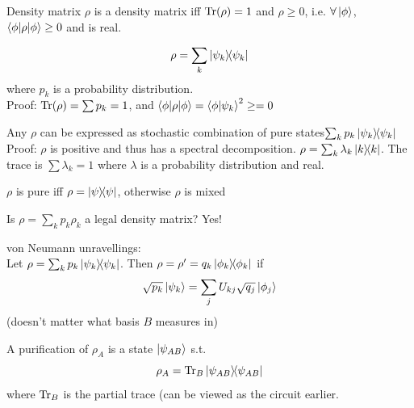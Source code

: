 \begin{definition}
    Density matrix $\rho$ is a density matrix iff $\Tr(\rho) = 1$ and $\rho \geq 0$, i.e. $\forall \ket{\phi}$, $\braket{\phi|\rho|\phi} \geq 0$ and is real. 
\end{definition}

\begin{claim}
    \begin{equation}
        \rho = \sum_k \ketbra{\psi_k}
    \end{equation}
    where $p_k$ is a probability distribution. \\
    Proof: $\Tr(\rho) = \sum p_k = 1$, and $\braket{\phi|\rho|\phi} = \braket{\phi|\psi_k}^2 \geq = 0$
\end{claim}

\begin{claim}
    Any $\rho$ can be expressed as stochastic combination of pure states$\sum_k p_k \ketbra{\psi_k}$ \\
    Proof: $\rho$ is positive and thus has a spectral decomposition. $\rho = \sum_k \lambda_k \ketbra{k}$. The trace is $\sum \lambda_k = 1$ where $\lambda$ is a probability distribution and real. 
\end{claim}

\begin{definition}
    $\rho$ is pure iff $\rho = \ketbra{\psi}$, otherwise $\rho$ is mixed
\end{definition}

Is $\rho = \sum_k p_k \rho_k$ a legal density matrix? Yes!

\begin{lemma}
    von Neumann unravellings: \\
    Let $\rho = \sum_k p_k \ketbra{\psi_k}$. Then $\rho = \rho' = q_k \ketbra{\phi_k}$ if 
    \begin{equation}
        \sqrt{p_k} \ket{\psi_k} = \sum_j U_{kj}\sqrt{q_j}\ket{\phi_j}
    \end{equation}
    (doesn't matter what basis $B$ measures in)
\end{lemma}

\begin{definition}
    A purification of $\rho_A$ is a state $\ket{\psi_{AB}}$ s.t. 
    \begin{equation}
        \rho_A = \Tr_B \ketbra{\psi_{AB}}
    \end{equation}
    where $\Tr_B$ is the partial trace (can be viewed as the circuit earlier. 
\end{definition}


